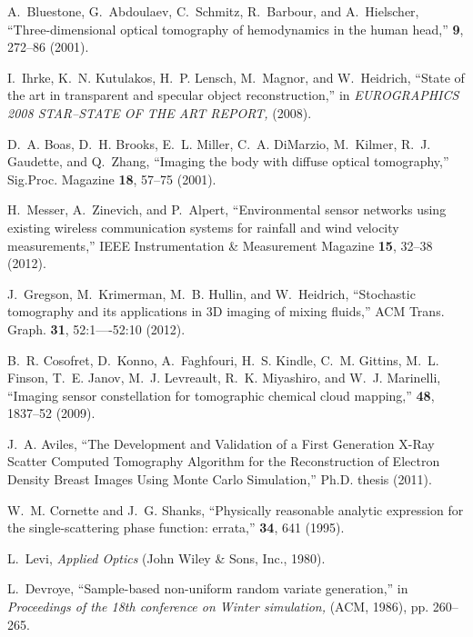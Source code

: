 \documentclass[10pt,letterpaper]{article}
\begin{document}
\begin{thebibliography}{10}
A.~Bluestone, G.~Abdoulaev, C.~Schmitz, R.~Barbour, and A.~Hielscher,
  \enquote{{Three-dimensional optical tomography of hemodynamics in the human
  head},} \opex \textbf{9}, 272--86 (2001).

I.~Ihrke, K.~N. Kutulakos, H.~P. Lensch, M.~Magnor, and W.~Heidrich,
  \enquote{{State of the art in transparent and specular object
  reconstruction},} in \emph{EUROGRAPHICS 2008 STAR--STATE OF THE ART
  REPORT,}  (2008).

D.~A. Boas, D.~H. Brooks, E.~L. Miller, C.~A. DiMarzio, M.~Kilmer, R.~J.
  Gaudette, and Q.~Zhang, \enquote{{Imaging the body with diffuse optical
  tomography},} Sig.Proc. Magazine \textbf{18}, 57--75 (2001).

H.~Messer, A.~Zinevich, and P.~Alpert, \enquote{{Environmental sensor networks
  using existing wireless communication systems for rainfall and wind velocity
  measurements},} IEEE Instrumentation \& Measurement Magazine \textbf{15},
  32--38 (2012).

J.~Gregson, M.~Krimerman, M.~B. Hullin, and W.~Heidrich, \enquote{{Stochastic
  tomography and its applications in 3D imaging of mixing fluids},} ACM Trans.
  Graph. \textbf{31}, 52:1----52:10 (2012).

B.~R. Cosofret, D.~Konno, A.~Faghfouri, H.~S. Kindle, C.~M. Gittins, M.~L.
  Finson, T.~E. Janov, M.~J. Levreault, R.~K. Miyashiro, and W.~J. Marinelli,
  \enquote{{Imaging sensor constellation for tomographic chemical cloud
  mapping},} \ao \textbf{48}, 1837--52 (2009).

J.~A. Aviles, \enquote{{The Development and Validation of a First Generation
  X-Ray Scatter Computed Tomography Algorithm for the Reconstruction of
  Electron Density Breast Images Using Monte Carlo Simulation},} Ph.D. thesis
  (2011).

W.~M. Cornette and J.~G. Shanks, \enquote{{Physically reasonable analytic
  expression for the single-scattering phase function: errata},} \ao
  \textbf{34}, 641 (1995).

L.~Levi, \emph{{Applied Optics}} (John Wiley \& Sons, Inc., 1980).

L.~Devroye, \enquote{{Sample-based non-uniform random variate generation},} in
  \emph{Proceedings of the 18th conference on Winter simulation,}  (ACM,
  1986), pp. 260--265.


\end{thebibliography}
\end{document}
